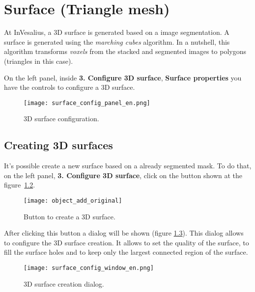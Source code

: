 \chapter{Surface (Triangle mesh)}
\label{cap_surface}

At InVesalius, a 3D surface is generated based on a image segmentation. A surface is generated using the \textit{marching cubes} algorithm. In a nutshell, this algorithm transforms \textit{voxels} from the stacked and segmented images to polygons (triangles in this case).

On the left panel, inside \textbf{3. Configure 3D surface}, \textbf{Surface properties} you have the controls to configure a 3D surface.

\begin{figure}[!htb]
\centering
\texttt{[image: surface\_config\_panel\_en.png]}
\caption{3D surface configuration.}
\label{fig:3d_surface_managment}
\end{figure}


\section{Creating 3D surfaces}

It's possible create a new surface based on a already segmented mask. To do that, on the left panel, \textbf{3. Configure 3D surface}, click on the button shown at the figure~\ref{fig:shortcut_new_surface}.

\begin{figure}[!htb]
\centering
\texttt{[image: object\_add\_original]}
\caption{Button to create a 3D surface.}
\label{fig:shortcut_new_surface}
\end{figure}

After clicking this button a dialog will be shown (figure \ref{fig:create_surface_1}). This dialog allows to configure the 3D surface creation. It allows to set the quality of the surface, to fill the surface holes and to keep only the largest connected region of the surface.

\begin{figure}[!htb]
\centering
\texttt{[image: surface\_config\_window\_en.png]}
\caption{3D surface creation dialog.}
\label{fig:create_surface_1}
\end{figure}


